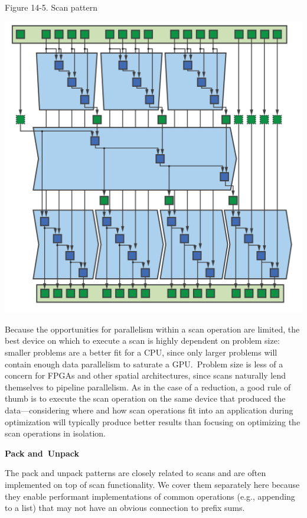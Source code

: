 \hspace*{\fill} \par %
Figure 14-5. Scan pattern
\begin{center}
	\includegraphics[width=1.\textwidth]{content/chapter-14/images/5}
\end{center}

Because the opportunities for parallelism within a scan operation are limited, the best device on which to execute a scan is highly dependent on problem size: smaller problems are a better fit for a CPU, since only larger problems will contain enough data parallelism to saturate a GPU. Problem size is less of a concern for FPGAs and other spatial architectures, since scans naturally lend themselves to pipeline parallelism. As in the case of a reduction, a good rule of thumb is to execute the scan operation on the same device that produced the data—considering where and how scan operations fit into an application during optimization will typically produce better results than focusing on optimizing the scan operations in isolation.\par

\hspace*{\fill} \par %
\textbf{Pack and Unpack}

The pack and unpack patterns are closely related to scans and are often implemented on top of scan functionality. We cover them separately here because they enable performant implementations of common operations (e.g., appending to a list) that may not have an obvious connection to prefix sums.\par

